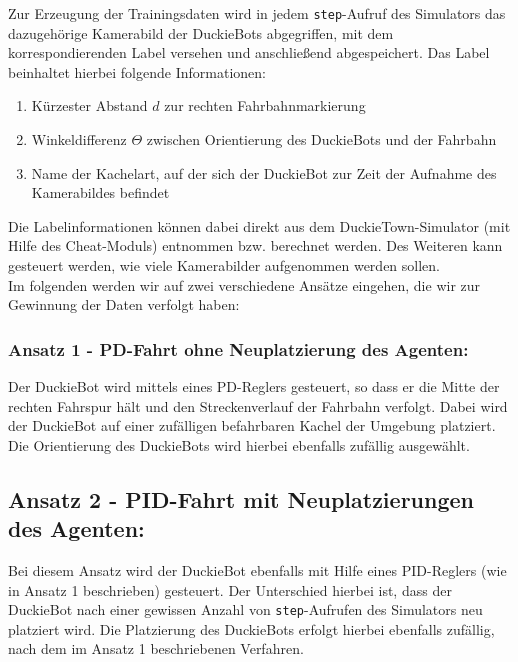 Zur Erzeugung der Trainingsdaten wird in jedem \texttt{step}-Aufruf des Simulators das dazugehörige Kamerabild der DuckieBots abgegriffen, mit dem korrespondierenden Label versehen und anschließend abgespeichert. Das Label beinhaltet hierbei folgende Informationen:

\begin{enumerate}
	\item Kürzester Abstand $d$ zur rechten Fahrbahnmarkierung
	\item Winkeldifferenz $\Theta$ zwischen Orientierung des DuckieBots und der Fahrbahn
	\item Name der Kachelart, auf der sich der DuckieBot zur Zeit der Aufnahme des Kamerabildes befindet
\end{enumerate}

Die Labelinformationen können dabei direkt aus dem DuckieTown-Simulator (mit Hilfe des \glqq Cheat-Moduls\grqq) entnommen bzw. berechnet werden. Des Weiteren kann gesteuert werden, wie viele Kamerabilder aufgenommen werden sollen. \\

Im folgenden werden wir auf zwei verschiedene Ansätze eingehen, die wir zur Gewinnung der Daten verfolgt haben:

\subsubsection{Ansatz 1 - PD-Fahrt ohne Neuplatzierung des Agenten:}

Der DuckieBot wird mittels eines PD-Reglers gesteuert, so dass er die Mitte der rechten Fahrspur hält und den Streckenverlauf der Fahrbahn verfolgt. Dabei wird der DuckieBot auf einer zufälligen befahrbaren Kachel der Umgebung platziert. Die Orientierung des DuckieBots  wird hierbei ebenfalls zufällig ausgewählt.

\subsection{Ansatz 2 - PID-Fahrt mit Neuplatzierungen des Agenten:}

Bei diesem Ansatz wird der DuckieBot ebenfalls mit Hilfe eines PID-Reglers (wie in Ansatz 1 beschrieben) gesteuert. Der Unterschied hierbei ist, dass der DuckieBot nach einer gewissen Anzahl von \texttt{step}-Aufrufen des Simulators neu platziert wird. Die Platzierung des DuckieBots erfolgt hierbei ebenfalls zufällig, nach dem im Ansatz 1 beschriebenen Verfahren.

